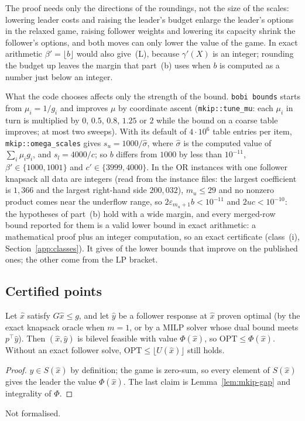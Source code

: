 The proof needs only the directions of the roundings, not the size of the
scales: lowering leader costs and raising the leader's budget enlarge the
leader's options in the relaxed game, raising follower weights and lowering
its capacity shrink the follower's options, and both moves can only lower the
value of the game. In exact arithmetic $\beta'=\lfloor b\rfloor$ would also
give~(L), because $\gamma'(X)$ is an integer; rounding the budget up leaves
the margin that part~(b) uses when $b$ is computed as a number just below an
integer.

What the code chooses affects only the strength of the bound.
\texttt{bobi bounds} starts from $\mu_i=1/g_i$ and improves $\mu$ by
coordinate ascent (\texttt{mkip::tune\_mu}: each $\mu_i$ in turn is
multiplied by $0$, $0.5$, $0.8$, $1.25$ or $2$ while the bound on a coarse
table improves; at most two sweeps). With its default of $4\cdot 10^6$ table
entries per item, \texttt{mkip::omega\_scales} gives $s_u=1000/\hat\sigma$,
where $\hat\sigma$ is the computed value of $\sum_i\mu_ig_i$, and $s_l=4000/c$;
so $b$ differs from $1000$ by less than $10^{-11}$, $\beta'\in\{1000,1001\}$
and $c'\in\{3999,4000\}$. In the \NumOrOneKnapsack{} OR instances with one
follower knapsack all data are integers (read from the instance files: the
largest coefficient is $1{,}366$ and the largest right-hand side $200{,}032$),
$m_u\le 29$ and no nonzero product comes near the underflow range, so
$2\varepsilon_{m_u+1}b<10^{-11}$ and $2uc<10^{-10}$: the hypotheses of
part~(b) hold with a wide margin, and every merged-row bound reported for
them is a valid lower bound in exact arithmetic: a mathematical proof plus an
integer computation, so an exact certificate (class~(i),
Section~\ref{app:classes}). It gives \SuppOrBetterLbOmega{} of the
\NumOrBetterLb{} lower bounds that improve on the published ones; the other
\SuppOrBetterLbMilp{} come from the LP bracket.

\subsection{Certified points}

\begin{proposition}\label{prop:mkip-point}
Let $\hat x$ satisfy $G\hat x\le g$, and let $\hat y$ be a follower response at
$\hat x$ proven optimal (by the exact knapsack oracle when $m=1$, or by a MILP
solver whose dual bound meets $p^{\top}\hat y$). Then $(\hat x,\hat y)$ is bilevel
feasible with value $\Phi(\hat x)$, so $\mathrm{OPT}\le\Phi(\hat x)$. Without an
exact follower solve, $\mathrm{OPT}\le\lfloor U(\hat x)\rfloor$ still holds.
\end{proposition}
\begin{proof}
$\hat y\in S(\hat x)$ by definition; the game is zero-sum, so every element of
$S(\hat x)$ gives the leader the value $\Phi(\hat x)$. The last claim is
Lemma~\ref{lem:mkip-gap} and integrality of $\Phi$.
\end{proof}
\noindent Not formalised.

